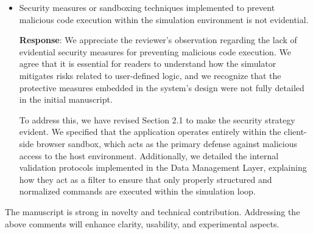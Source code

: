 \documentclass[12pt, a4paper]{article}
\begin{document}
\begin{itemize}
    \item  Security measures or sandboxing techniques implemented to prevent malicious code execution within the simulation environment is not evidential.

    {\color{blue}
        \textbf{Response}: We appreciate the reviewer’s observation regarding the lack of evidential security measures for preventing malicious code execution. We agree that it is essential for readers to understand how the simulator mitigates risks related to user-defined logic, and we recognize that the protective measures embedded in the system's design were not fully detailed in the initial manuscript.

        To address this, we have revised Section 2.1 to make the security strategy evident. We specified that the application operates entirely within the client-side browser sandbox, which acts as the primary defense against malicious access to the host environment. Additionally, we detailed the internal validation protocols implemented in the Data Management Layer, explaining how they act as a filter to ensure that only properly structured and normalized commands are executed within the simulation loop.
    }
\end{itemize}
The manuscript is strong in novelty and technical contribution. Addressing the above comments will enhance clarity, usability, and experimental aspects.
\end{document}

